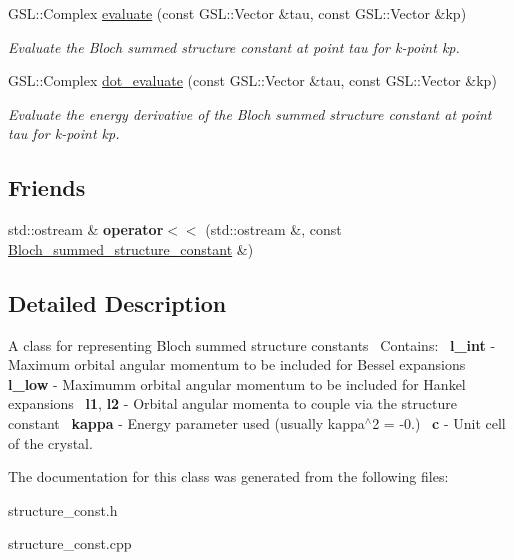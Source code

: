 \begin{DoxyCompactItemize}
G\+S\+L\+::\+Complex \hyperlink{classBloch__summed__structure__constant_a43503e7c75fb86c7646ec9373c7bd5fc}{evaluate} (const G\+S\+L\+::\+Vector \&tau, const G\+S\+L\+::\+Vector \&kp)
\begin{DoxyCompactList}\small\item\em Evaluate the Bloch summed structure constant at point tau for k-\/point kp. \end{DoxyCompactList}\item 
\mbox{\label{classBloch__summed__structure__constant_abc1d8c593a9f4e6dca95f969847dfe67}} 
G\+S\+L\+::\+Complex \hyperlink{classBloch__summed__structure__constant_abc1d8c593a9f4e6dca95f969847dfe67}{dot\+\_\+evaluate} (const G\+S\+L\+::\+Vector \&tau, const G\+S\+L\+::\+Vector \&kp)
\begin{DoxyCompactList}\small\item\em Evaluate the energy derivative of the Bloch summed structure constant at point tau for k-\/point kp. \end{DoxyCompactList}\end{DoxyCompactItemize}
\subsection*{Friends}
\begin{DoxyCompactItemize}
\item 
\mbox{\label{classBloch__summed__structure__constant_a842c35198ecf8ef46be7efe1471b4809}} 
std\+::ostream \& {\bfseries operator$<$$<$} (std\+::ostream \&, const \hyperlink{classBloch__summed__structure__constant}{Bloch\+\_\+summed\+\_\+structure\+\_\+constant} \&)
\end{DoxyCompactItemize}


\subsection{Detailed Description}
A class for representing Bloch summed structure constants~\newline
Contains\+:~\newline
{\bfseries l\+\_\+int} -\/ Maximum orbital angular momentum to be included for Bessel expansions~\newline
 {\bfseries l\+\_\+low} -\/ Maximumm orbital angular momentum to be included for Hankel expansions~\newline
 {\bfseries l1}, {\bfseries l2} -\/ Orbital angular momenta to couple via the structure constant~\newline
{\bfseries kappa} -\/ Energy parameter used (usually kappa$^\wedge$2 = -\/0.)~\newline
{\bfseries c} -\/ Unit cell of the crystal.~\newline


The documentation for this class was generated from the following files\+:\begin{DoxyCompactItemize}
\item 
structure\+\_\+const.\+h\item 
structure\+\_\+const.\+cpp\end{DoxyCompactItemize}
